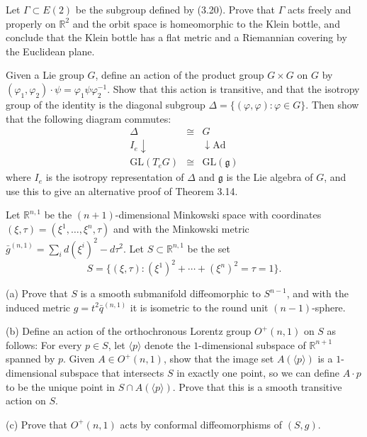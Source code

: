\begin{exercise}\label{prob:klein-bottle-flat-covering}
Let $\Gamma \subset E(2)$ be the subgroup defined by (3.20). Prove that $\Gamma$ acts freely and properly on $\mathbb{R}^2$ and the orbit space is homeomorphic to the Klein bottle, and conclude that the Klein bottle has a flat metric and a Riemannian covering by the Euclidean plane.
\end{exercise}

\begin{exercise}\label{prob:lie-group-adjoint-representation}
Given a Lie group $G$, define an action of the product group $G \times G$ on $G$ by $(\varphi_1,\varphi_2) \cdot \psi = \varphi_1\psi\varphi_2^{-1}$. Show that this action is transitive, and that the isotropy group of the identity is the diagonal subgroup $\Delta = \{(\varphi,\varphi) : \varphi \in G\}$. Then show that the following diagram commutes:
\[\begin{array}{ccc}
\Delta & \cong & G \\
I_e \downarrow & & \downarrow \mathrm{Ad} \\
\mathrm{GL}(T_e G) & \cong & \mathrm{GL}(\mathfrak{g})
\end{array}\]
where $I_e$ is the isotropy representation of $\Delta$ and $\mathfrak{g}$ is the Lie algebra of $G$, and use this to give an alternative proof of Theorem 3.14.
\end{exercise}

\begin{exercise}
\label{prob:minkowski-hyperboloid}
Let $\mathbb{R}^{n,1}$ be the $(n+1)$-dimensional Minkowski space with coordinates $(\xi, \tau) = (\xi^1, \ldots, \xi^n, \tau)$ and with the Minkowski metric $\bar{g}^{(n,1)} = \sum_i d(\xi^i)^2 - d\tau^2$. Let $S \subset \mathbb{R}^{n,1}$ be the set
\[
S = \{(\xi, \tau) : (\xi^1)^2 + \cdots + (\xi^n)^2 = \tau = 1\}.
\]

(a) Prove that $S$ is a smooth submanifold diffeomorphic to $S^{n-1}$, and with the induced metric $g = t^2 \bar{q}^{(n,1)}$ it is isometric to the round unit $(n-1)$-sphere.

(b) Define an action of the orthochronous Lorentz group $O^+(n,1)$ on $S$ as follows: For every $p \in S$, let $\langle p \rangle$ denote the $1$-dimensional subspace of $\mathbb{R}^{n+1}$ spanned by $p$. Given $A \in O^+(n,1)$, show that the image set $A(\langle p \rangle)$ is a $1$-dimensional subspace that intersects $S$ in exactly one point, so we can define $A \cdot p$ to be the unique point in $S \cap A(\langle p \rangle)$. Prove that this is a smooth transitive action on $S$.

(c) Prove that $O^+(n,1)$ acts by conformal diffeomorphisms of $(S,g)$.
\end{exercise}

